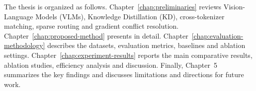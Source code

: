 The thesis is organized as follows. Chapter~\ref{chap:preliminaries} reviews
Vision-Language Models (VLMs), Knowledge Distillation (KD), cross-tokenizer
matching, sparse routing and gradient conflict resolution.
Chapter~\ref{chap:proposed-method} presents \methodname{} in detail.
Chapter~\ref{chap:evaluation-methodology} describes the datasets, evaluation
metrics, baselines and ablation settings. Chapter~\ref{chap:experiment-results}
reports the main comparative results, ablation studies, efficiency analysis
and discussion. Finally, Chapter~5 summarizes the key findings and discusses
limitations and directions for future work.
